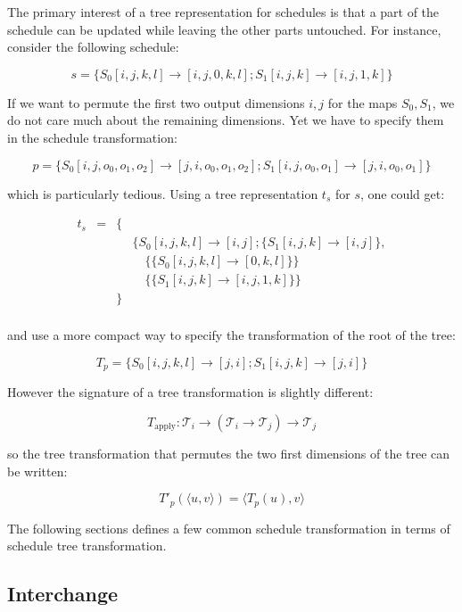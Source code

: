 \documentclass{article}
\begin{document}
The primary interest of a tree representation for schedules is that a part of
the schedule can be updated while leaving the other parts untouched. For instance, consider the following schedule:

\[
    s = \{ S_0[i,j,k,l] \rightarrow [i,j,0,k,l] ; S_1[i,j,k] \rightarrow [i,j,1,k] \}
\]

If we want to permute the first two output dimensions $i, j$ for the maps
$S_0, S_1$, we do not care much about the remaining dimensions. Yet we have to
specify them in the schedule transformation:

\[
    p = \{ S_0[i,j,o_0,o_1,o_2] \rightarrow [j,i,o_0,o_1,o_2] ; S_1[i,j,o_0, o_1] \rightarrow [j,i,o_0,o_1] \}
\]

\noindent which is particularly tedious. Using a tree representation $t_s$ for $s$, one could get:

\[
    \begin{array}{lcll}
        t_s &=& \{ &\\
            & &    & \{S_0[i,j,k,l] \rightarrow [i,j] ; \{S_1[i,j,k] \rightarrow [i,j] \},\\
            & &    & \quad\{ \{ S_0[i,j,k,l] \rightarrow [0,k,l] \} \}\\
            & &    & \quad\{ \{ S_1[i,j,k] \rightarrow [i,j,1,k] \} \}\\
            & & \} &\\
    \end{array}
\]

\noindent and use a more compact way to specify the transformation of the root of the tree:

\[
    T_p = \{ S_0[i,j,k,l] \rightarrow [j,i] ; S_1[i,j,k] \rightarrow [j,i] \}
\]

However the signature of a tree transformation is slightly different:

\[
    T_\mathrm{apply}: \mathcal{T}_i \rightarrow ( \mathcal{T}_i \rightarrow \mathcal{T}_j) \rightarrow \mathcal{T}_j
\]


\noindent so the tree transformation that permutes the two first dimensions of the tree can be written:

\[
    T'_p(\langle u, v \rangle) = \langle T_p(u), v \rangle
\]


The following sections defines a few common schedule transformation in terms of schedule tree transformation.

\subsection{Interchange}
\end{document}
